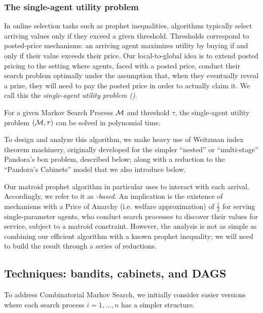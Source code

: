 \subsubsection{The single-agent utility problem}

In online selection tasks such as prophet inequalities, algorithms typically select arriving values only if they exceed a given threshold.
Thresholds correspond to posted-price mechanisms: an arriving agent maximizes utility by buying if and only if their value exceeds their price.
Our local-to-global idea is to extend posted pricing to the setting where agents, faced with a posted price, conduct their search problem optimally under the assumption that, when they eventually reveal a prize, they will need to pay the posted price in order to actually claim it.
We call this the \emph{single-agent utility problem (\SAUP{})}.
\begin{prop*}
  For a given Markov Search Process $\mathcal{M}$ and threshold $\tau$, the single-agent utility problem \SAUP{}$(\mathcal{M},\tau)$ can be solved in polynomial time.
\end{prop*}
To design and analyze this algorithm, we make heavy use of Weitzman index theorem machinery, originally developed for the simpler ``nested'' or ``multi-stage'' Pandora's box problem, described below; along with a reduction to the ``Pandora's Cabinets'' model that we also introduce below.

Our matroid prophet algorithm in particular uses \SAUP{} to interact with each arrival. Accordingly, we refer to it as \emph{\SAUP-based}.
An implication is the existence of mechanisms with a Price of Anarchy (i.e. welfare approximation) of $\frac{1}{2}$ for serving single-parameter agents, who conduct search processes to discover their values for service, subject to a matroid constraint.
However, the analysis is not as simple as combining our efficient \SAUP{} algorithm with a known prophet inequality; we will need to build the result through a series of reductions.


\subsection{Techniques: bandits, cabinets, and DAGS}



To address Combinatorial Markov Search, we initially consider easier versions where each search process $i=1,\dots,n$ has a simpler structure.

